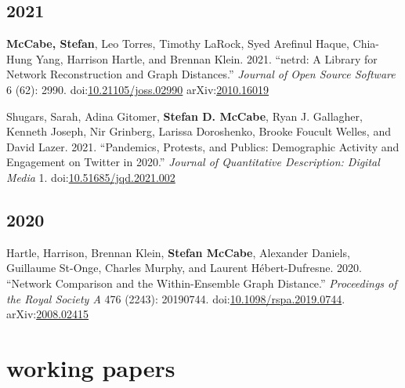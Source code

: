 \documentclass[11pt, letter]{article}
\begin{document}
\subsection{2021}
\begin{hangparas}{.25in}{1}
\textbf{McCabe, Stefan}, Leo Torres, Timothy LaRock, Syed Arefinul Haque,
Chia-Hung Yang, Harrison Hartle, and Brennan Klein. 2021.
``netrd: A Library for Network Reconstruction and Graph Distances.''
\textit{Journal of Open Source Software} 6 (62): 2990.
doi:\href{https://doi.org/10.21105/joss.02990}{10.21105/joss.02990}
arXiv:\href{https://arxiv.org/abs/2010.16019}{2010.16019} \vspace{2mm}

Shugars, Sarah, Adina Gitomer, \textbf{Stefan D. McCabe}, Ryan J. Gallagher,
Kenneth Joseph, Nir Grinberg, Larissa Doroshenko, Brooke Foucult Welles, and
David Lazer. 2021. ``Pandemics, Protests, and Publics: Demographic Activity and
Engagement on Twitter in 2020.'' \textit{Journal of Quantitative Description:
  Digital Media} 1.
doi:\href{https://doi.org/10.51685/jqd.2021.002}{10.51685/jqd.2021.002} \vspace{2mm}
\end{hangparas}

\subsection{2020}
\begin{hangparas}{.25in}{1}
  Hartle, Harrison, Brennan Klein, \textbf{Stefan McCabe}, Alexander Daniels,
  Guillaume St-Onge, Charles Murphy, and Laurent Hébert-Dufresne. 2020.
  ``Network Comparison and the Within-Ensemble Graph Distance.''
  \textit{Proceedings of the Royal Society A} 476 (2243): 20190744.
  doi:\href{https://doi.org/10.1098/rspa.2019.0744}{10.1098/rspa.2019.0744}.
  arXiv:\href{https://arxiv.org/abs/2008.02415}{2008.02415} \vspace{2mm}
\end{hangparas}

\section{working papers}
\end{document}
